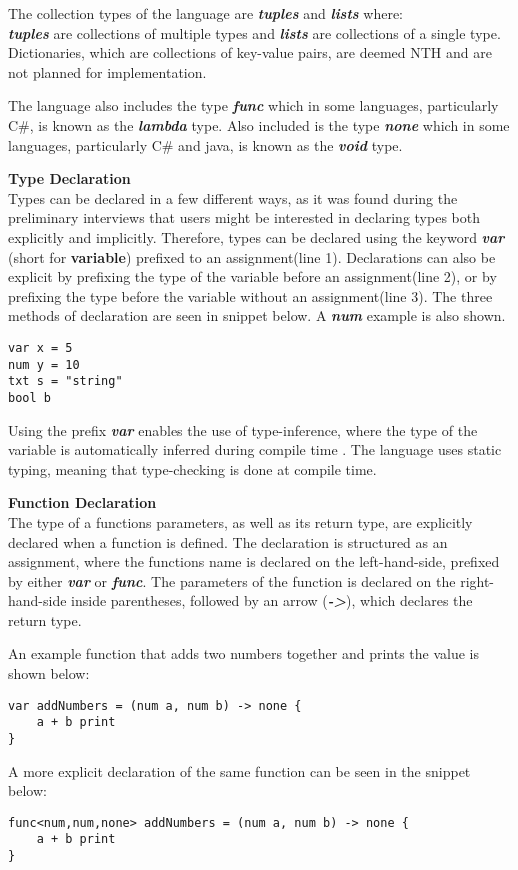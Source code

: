 The collection types of the language are \textbf{\textit{tuples}} and \textbf{\textit{lists}} where:\\
\textbf{\textit{tuples}} are collections of multiple types and \textbf{\textit{lists}} are collections of a single type.
Dictionaries, which are collections of key-value pairs, are deemed NTH and are not planned for implementation. 

The language also includes the type \textbf{\textit{func}} which in some languages, particularly C\#, is known as the \textbf{\textit{lambda}} type.
Also included is the type \textbf{\textit{none}} which in some languages, particularly C\# and java, is known as the \textbf{\textit{void}} type. 

\textbf{Type Declaration}\\
Types can be declared in a few different ways, as it was found during the preliminary interviews that users might be interested in declaring types both explicitly and implicitly.
Therefore, types can be declared using the keyword \textbf{\textit{var}} (short for \textbf{variable\textit{}}) prefixed to an assignment(line 1).
Declarations can also be explicit by prefixing the type of the variable before an assignment(line 2), or by prefixing the type before the variable without an assignment(line 3).
The three methods of declaration are seen in snippet below.
A  \textbf{\textit{num}} example is also shown.
\begin{lstlisting}
var x = 5
num y = 10
txt s = "string"
bool b
\end{lstlisting}

Using the prefix \textbf{\textit{var}} enables the use of type-inference, where the type of the variable is automatically inferred during compile time \cite{typeinf}.
The language uses static typing, meaning that type-checking is done at compile time.

\textbf{Function Declaration}\\
The type of a functions parameters, as well as its return type, are explicitly declared when a function is defined. 
The declaration is structured as an assignment, where the functions name is declared on the left-hand-side, prefixed by either \textbf{\textit{var}} or \textbf{\textit{func}}. 
The parameters of the function is declared on the right-hand-side inside parentheses, followed by an arrow (\textbf{\textit{->}}), which declares the return type. 

An example function that adds two numbers together and prints the value is shown below:
\begin{lstlisting}
var addNumbers = (num a, num b) -> none {
	a + b print
}
\end{lstlisting} 
A more explicit declaration of the same function can be seen in the snippet below:
\begin{lstlisting}
func<num,num,none> addNumbers = (num a, num b) -> none {
	a + b print
}
\end{lstlisting}

